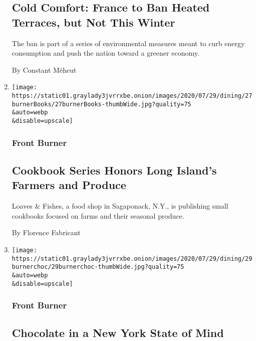\begin{enumerate}
  \hypertarget{cold-comfort-france-to-ban-heated-terraces-but-not-this-winter}{%
  \subsection{Cold Comfort: France to Ban Heated Terraces, but Not This
  Winter}\label{cold-comfort-france-to-ban-heated-terraces-but-not-this-winter}}

  The ban is part of a series of environmental measures meant to curb
  energy consumption and push the nation toward a greener economy.

  By Constant Méheut
\item
  \href{/2020/07/27/dining/fishes-and-loaves-farm-cookbooks.html}{}

  \texttt{[image: https://static01.graylady3jvrrxbe.onion/images/2020/07/29/dining/27burnerBooks/27burnerBooks-thumbWide.jpg?quality=75\\\&auto=webp\\\&disable=upscale]}

  \hypertarget{front-burner-1}{%
  \subsubsection{Front Burner}\label{front-burner-1}}

  \hypertarget{cookbook-series-honors-long-islands-farmers-and-produce}{%
  \subsection{Cookbook Series Honors Long Island's Farmers and
  Produce}\label{cookbook-series-honors-long-islands-farmers-and-produce}}

  Loaves \& Fishes, a food shop in Sagaponack, N.Y., is publishing small
  cookbooks focused on farms and their seasonal produce.

  By Florence Fabricant
\item
  \href{/2020/07/27/dining/marie-belle-nyc-chocolate.html}{}

  \texttt{[image: https://static01.graylady3jvrrxbe.onion/images/2020/07/29/dining/29burnerchoc/29burnerchoc-thumbWide.jpg?quality=75\\\&auto=webp\\\&disable=upscale]}

  \hypertarget{front-burner-2}{%
  \subsubsection{Front Burner}\label{front-burner-2}}

  \hypertarget{chocolate-in-a-new-york-state-of-mind}{%
  \subsection{Chocolate in a New York State of
  Mind}\label{chocolate-in-a-new-york-state-of-mind}}


\end{enumerate}
